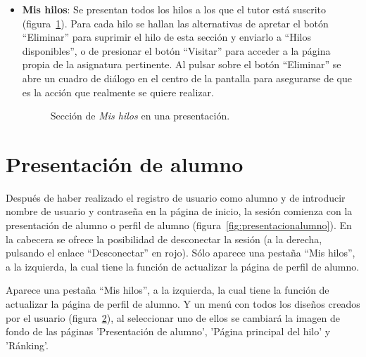 \documentclass[a4paper, 12pt]{book}
\begin{document}
\begin{itemize}
  \item {\bfseries Mis hilos}: Se presentan todos los hilos a los que el tutor est\'a suscrito (figura~\ref{figura:tutor3}). Para cada hilo se hallan las 
  alternativas de apretar el bot\'on ``Eliminar'' para suprimir el hilo de esta secci\'on y enviarlo a ``Hilos disponibles'', o de presionar el bot\'on
  ``Visitar'' para acceder a la p\'agina propia de la asignatura pertinente. Al pulsar sobre el bot\'on ``Eliminar'' se abre un cuadro de di\'alogo en el 
  centro de la pantalla para asegurarse de que es la acci\'on que realmente se quiere realizar.
  \begin{figure}[htbp] 
    \centering
    \caption{Secci\'on de \textit{Mis hilos} en una presentaci\'on.}
    \label{figura:tutor3}
  \end{figure}
\end{itemize} 


\section{Presentaci\'on de alumno}
\label{app:presentacionalumno}
Despu\'es de haber realizado el registro de usuario como alumno y de introducir nombre de usuario y contrase\~na en la p\'agina de inicio, la sesi\'on 
comienza con la presentaci\'on de alumno o perfil de alumno (figura~\ref{fig:presentacionalumno}). En la cabecera se ofrece la posibilidad de desconectar la sesi\'on 
(a la derecha, pulsando el enlace ``Desconectar'' en rojo). S\'olo aparece una pesta\~na ``Mis hilos'', a la izquierda, la cual tiene la funci\'on de 
actualizar la p\'agina de perfil de alumno. 

Aparece una pesta\~na ``Mis hilos'', a la izquierda, la cual tiene la funci\'on de actualizar la p\'agina de perfil de alumno. Y un men\'u con todos 
los dise\~nos creados por el usuario (figura~\ref{fig:listadisenos}), al seleccionar uno de ellos se cambiar\'a la imagen de fondo de las p\'aginas 'Presentaci\'on de alumno', 'P\'agina principal del hilo' 
y 'R\'anking'.

\begin{figure}[htbp] 
  \centering
  \caption{}
  \label{fig:listadisenos}
\end{figure}
\end{document}
